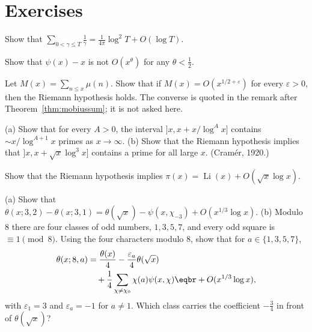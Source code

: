 \section{Exercises}

\begin{exercise}[$\star$]\label{ex:sumgamma}
Show that $\displaystyle\sum_{0<\gamma\le T}\frac1\gamma=\frac1{4\pi}\log^2T+O(\log T)$.
\end{exercise}

\begin{exercise}[$\star$]\label{ex:omegahalf}
Show that $\psi(x)-x$ is not $O(x^\theta)$ for any $\theta<\frac12$.
\end{exercise}

\begin{exercise}[$\star$]\label{ex:mertensRH}
Let $M(x)=\sum_{n\le x}\mu(n)$. Show that if $M(x)=O(x^{1/2+\varepsilon})$ for every $\varepsilon>0$, then the Riemann hypothesis holds. The converse is quoted in the remark after Theorem~\ref{thm:mobiussum}; it is not asked here.
\end{exercise}

\begin{exercise}[$\star\star$]\label{ex:shortprime}
(a) Show that for every $A>0$, the interval $\bigl]x,x+x/\log^Ax\bigr]$ contains $\sim x/\log^{A+1}x$ primes as $x\to\infty$.
(b) Show that the Riemann hypothesis implies that $]x,x+\sqrt x\log^3x]$ contains a prime for all large $x$. (Cram\'er, 1920.)
\end{exercise}

\begin{exercise}[$\star\star$]\label{ex:vonkoch}
Show that the Riemann hypothesis implies $\pi(x)=\operatorname{Li}(x)+O(\sqrt x\log x)$.
\end{exercise}

\begin{exercise}\label{ex:bias}
(a) Show that $\theta(x;3,2)-\theta(x;3,1)=\theta(\sqrt x)-\psi(x,\chi_{-3})+O(x^{1/3}\log x)$.
(b) Modulo $8$ there are four classes of odd numbers, $1,3,5,7$, and every odd square is $\equiv1\pmod8$. Using the four characters modulo $8$, show that for $a\in\{1,3,5,7\}$,
\[
\begin{aligned}\theta(x;8,a)&=\frac{\theta(x)}4-\frac{\varepsilon_a}4\theta(\sqrt x)\\&\quad+\frac14\sum_{\chi\ne\chi_0}\chi(a)\psi(x,\chi)\eqbr+O(x^{1/3}\log x),\end{aligned}
\]
with $\varepsilon_1=3$ and $\varepsilon_a=-1$ for $a\ne1$. Which class carries the coefficient $-\frac34$ in front of $\theta(\sqrt x)$?
\end{exercise}

